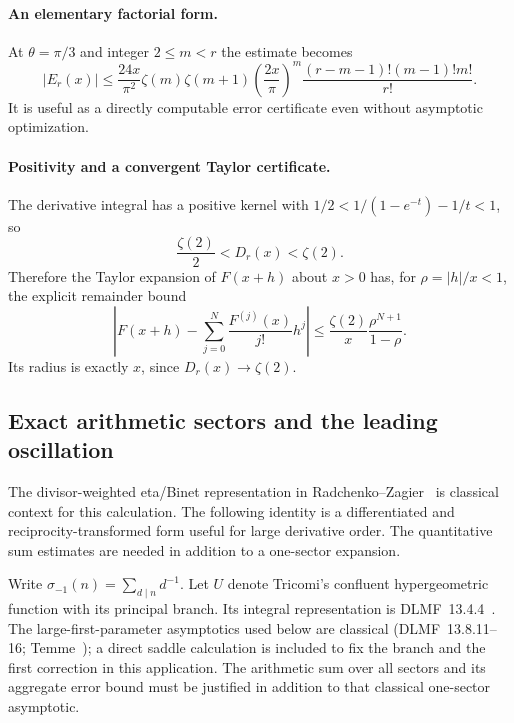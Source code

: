 \paragraph{An elementary factorial form.}
At $\theta=\pi/3$ and integer $2\le m<r$ the estimate becomes
\[
 |E_r(x)|\le \frac{24x}{\pi^2}\zeta(m)\zeta(m+1)
 \left(\frac{2x}{\pi}\right)^m
 \frac{(r-m-1)!(m-1)!m!}{r!}.
\]
It is useful as a directly computable error certificate even without
asymptotic optimization.

\paragraph{Positivity and a convergent Taylor certificate.}
The derivative integral has a positive kernel with
$1/2<1/(1-e^{-t})-1/t<1$, so
\[
 \frac{\zeta(2)}2<D_r(x)<\zeta(2).
\]
Therefore the Taylor expansion of $F(x+h)$ about $x>0$ has, for
$\rho=|h|/x<1$, the explicit remainder bound
\[
 \left|F(x+h)-\sum_{j=0}^{N}\frac{F^{(j)}(x)}{j!}h^j\right|
 \le\frac{\zeta(2)}x\frac{\rho^{N+1}}{1-\rho}.
\]
Its radius is exactly $x$, since $D_r(x)\to\zeta(2)$.

\subsection{Exact arithmetic sectors and the leading oscillation}

The divisor-weighted eta/Binet representation in Radchenko--Zagier~\cite[Section~7.3]{RZ} is classical context for this calculation. The following identity is a differentiated and reciprocity-transformed form useful for large derivative order. The quantitative sum estimates are needed in addition to a one-sector expansion.


Write $\sigma_{-1}(n)=\sum_{d\mid n}d^{-1}$. Let $U$ denote Tricomi's
confluent hypergeometric function with its principal branch. Its integral
representation is DLMF~13.4.4~\cite{DLMF}. The large-first-parameter asymptotics used
below are classical (DLMF~13.8.11--16; Temme~\cite{Temme}); a direct saddle calculation
is included to fix the branch and the first correction in this application.
The arithmetic sum over all sectors and its aggregate error bound must be
justified in addition to that classical one-sector asymptotic.

